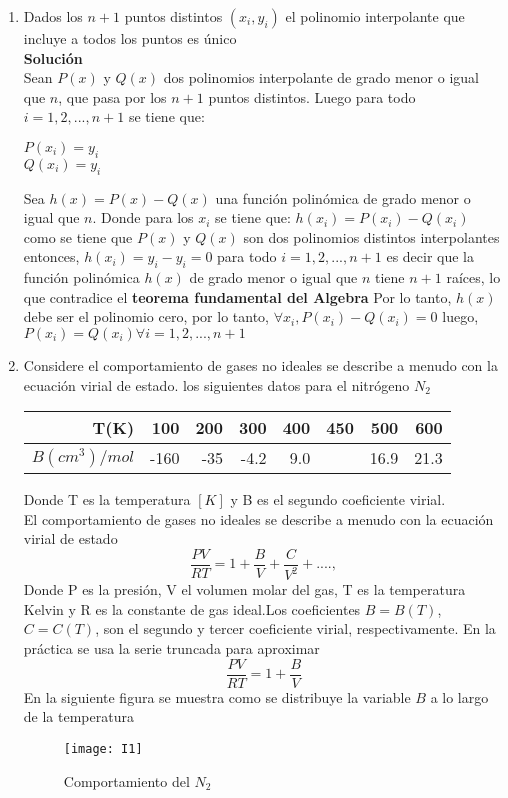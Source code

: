 \documentclass[12pt,letterpaper]{exam}
\begin{document}
\begin{enumerate}

\item
Dados los $n+1$ puntos distintos $(x_{i},y_{i})$ el polinomio interpolante que incluye a todos los puntos es único\\
\textbf{Solución}\\
Sean $P(x)$ y $Q(x)$ dos polinomios interpolante de grado menor o igual que $n$, que pasa por los $n+1$ puntos distintos. Luego para todo $i=1,2,...,n+1$ se tiene que:
\begin{center}
	$P(x_{i})=y_{i}$\\
	$Q(x_{i})=y_{i}$
\end{center}
Sea $h(x)=P(x)-Q(x)$ una función polinómica de grado menor o igual que $n$. Donde para los $x_{i}$ se tiene que: $h(x_{i})=P(x_{i})-Q(x_{i})$ como se tiene que $P(x)$ y $Q(x)$ son dos polinomios distintos interpolantes entonces, $h(x_{i})=y_{i}-y_{i}=0$ para todo $i=1,2,...,n+1$ es decir que la función polinómica $h(x)$ de grado menor o igual que $n$ tiene $n+1$ raíces, lo que contradice el \textbf{teorema fundamental del Algebra} Por lo tanto, $h(x)$ debe ser el polinomio cero, por lo tanto, $\forall x_{i}, P(x_{i})-Q(x_{i})=0$ luego,$ P(x_{i})=Q(x_{i}) \forall i=1,2,...,n+1$


\item
Considere el comportamiento de gases no ideales se describe a menudo con la ecuación virial de estado. los siguientes datos para el nitrógeno $N_{2}$


\begin{center}
	\begin{tabular}{|r|r|r|r|r|r|r|r|}
		\hline
		\rowcolor{blue} {T(K)} & 100 & 200 & 300 & 400 & 450 & 500 & 600\\
		\hline
		\rowcolor[gray]{0.9} $B(cm^{3})/mol$ & -160 & -35 & -4.2 & 9.0 &  & 16.9 & 21.3 \\
		
		\hline
	\end{tabular}
\end{center}
Donde T es la temperatura $[K]$ y B es el segundo coeficiente virial.\\
El comportamiento de gases no ideales se describe a menudo con la ecuación virial de estado
\begin{equation}
\dfrac{PV}{RT}=1+\dfrac{B}{V}+\dfrac{C}{V^{2}}+....,
\end{equation}
Donde P es la presión, V el volumen molar del gas, T es la temperatura Kelvin y R es la constante de gas ideal.Los coeficientes $B = B(T)$, $C =
C(T)$, son el segundo y tercer coeficiente virial, respectivamente. En la práctica se usa la serie truncada para aproximar
\begin{equation}
\dfrac{PV}{RT}=1+\dfrac{B}{V}
\end{equation}
En la siguiente figura se muestra como se distribuye la variable $B$ a lo largo de la temperatura
\begin{center} 
	\begin{figure}[h]
		\centering%
		\texttt{[image: I1]}
		\caption{Comportamiento del $N_{2}$} 
	\end{figure}
\end{center}


\end{enumerate}
\end{document}
